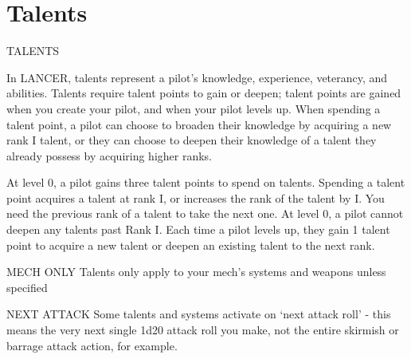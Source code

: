 \section{Talents}
    TALENTS  

In LANCER, talents represent a pilot’s knowledge, experience, veterancy, and abilities. Talents  
require talent points to gain or deepen; talent points are gained when you create your pilot, and  
when your pilot levels up. When spending a talent point, a pilot can choose to broaden their  
knowledge by acquiring a new rank I talent, or they can choose to deepen their knowledge of a  
talent they already possess by acquiring higher ranks.
 

At level 0, a pilot gains three talent points to spend on talents. Spending a talent point acquires a  
talent at rank I, or increases the rank of the talent by I. You need the previous rank of a talent to  
take the next one. At level 0, a pilot cannot deepen any talents past Rank I. Each time a pilot  
levels up, they gain 1 talent point to acquire a new talent or deepen an existing talent to the next  
rank.
 

                                                MECH ONLY  
Talents only apply to your mech’s systems and weapons unless specified
 

                                               NEXT ATTACK  
Some talents and systems activate on ‘next attack roll’  - this means the very next single 1d20  
attack roll you make, not the entire skirmish or barrage attack action, for example.
